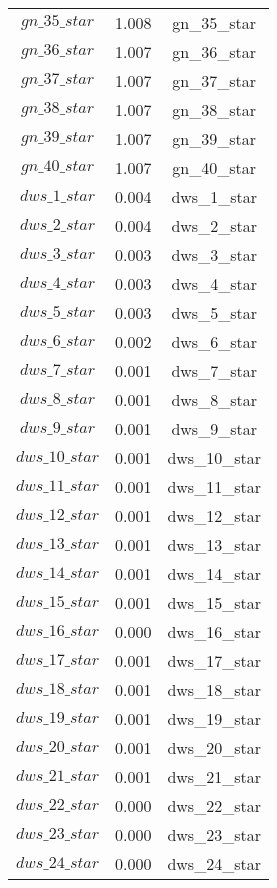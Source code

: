 \begin{center}
\begin{longtable}{ccc}
$gn\_35\_star$ 	 & 	 1.008 	 & 	 gn\_35\_star\\
$gn\_36\_star$ 	 & 	 1.007 	 & 	 gn\_36\_star\\
$gn\_37\_star$ 	 & 	 1.007 	 & 	 gn\_37\_star\\
$gn\_38\_star$ 	 & 	 1.007 	 & 	 gn\_38\_star\\
$gn\_39\_star$ 	 & 	 1.007 	 & 	 gn\_39\_star\\
$gn\_40\_star$ 	 & 	 1.007 	 & 	 gn\_40\_star\\
$dws\_1\_star$ 	 & 	 0.004 	 & 	 dws\_1\_star\\
$dws\_2\_star$ 	 & 	 0.004 	 & 	 dws\_2\_star\\
$dws\_3\_star$ 	 & 	 0.003 	 & 	 dws\_3\_star\\
$dws\_4\_star$ 	 & 	 0.003 	 & 	 dws\_4\_star\\
$dws\_5\_star$ 	 & 	 0.003 	 & 	 dws\_5\_star\\
$dws\_6\_star$ 	 & 	 0.002 	 & 	 dws\_6\_star\\
$dws\_7\_star$ 	 & 	 0.001 	 & 	 dws\_7\_star\\
$dws\_8\_star$ 	 & 	 0.001 	 & 	 dws\_8\_star\\
$dws\_9\_star$ 	 & 	 0.001 	 & 	 dws\_9\_star\\
$dws\_10\_star$ 	 & 	 0.001 	 & 	 dws\_10\_star\\
$dws\_11\_star$ 	 & 	 0.001 	 & 	 dws\_11\_star\\
$dws\_12\_star$ 	 & 	 0.001 	 & 	 dws\_12\_star\\
$dws\_13\_star$ 	 & 	 0.001 	 & 	 dws\_13\_star\\
$dws\_14\_star$ 	 & 	 0.001 	 & 	 dws\_14\_star\\
$dws\_15\_star$ 	 & 	 0.001 	 & 	 dws\_15\_star\\
$dws\_16\_star$ 	 & 	 0.000 	 & 	 dws\_16\_star\\
$dws\_17\_star$ 	 & 	 0.001 	 & 	 dws\_17\_star\\
$dws\_18\_star$ 	 & 	 0.001 	 & 	 dws\_18\_star\\
$dws\_19\_star$ 	 & 	 0.001 	 & 	 dws\_19\_star\\
$dws\_20\_star$ 	 & 	 0.001 	 & 	 dws\_20\_star\\
$dws\_21\_star$ 	 & 	 0.001 	 & 	 dws\_21\_star\\
$dws\_22\_star$ 	 & 	 0.000 	 & 	 dws\_22\_star\\
$dws\_23\_star$ 	 & 	 0.000 	 & 	 dws\_23\_star\\
$dws\_24\_star$ 	 & 	 0.000 	 & 	 dws\_24\_star\\

\end{longtable}
\end{center}
